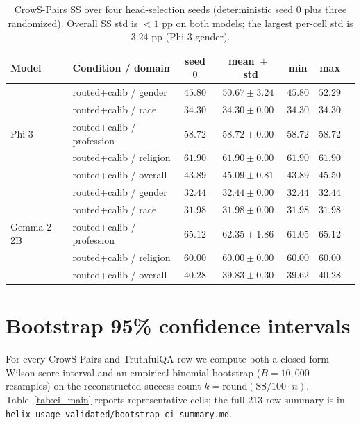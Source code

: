 \begin{table}[h]
\centering
\small
\caption{CrowS-Pairs SS over four head-selection seeds (deterministic
seed $0$ plus three randomized). Overall SS std is $<1$ pp on both
models; the largest per-cell std is $3.24$ pp (Phi-3 gender).}
\label{tab:seed_variance}
\begin{tabular}{llccccc}
\toprule
Model & Condition / domain & seed $0$ & mean~$\pm$~std & min & max \\
\midrule
\multirow{5}{*}{Phi-3}
& routed+calib / gender     & $45.80$ & $50.67 \pm 3.24$ & $45.80$ & $52.29$ \\
& routed+calib / race       & $34.30$ & $34.30 \pm 0.00$ & $34.30$ & $34.30$ \\
& routed+calib / profession & $58.72$ & $58.72 \pm 0.00$ & $58.72$ & $58.72$ \\
& routed+calib / religion   & $61.90$ & $61.90 \pm 0.00$ & $61.90$ & $61.90$ \\
& routed+calib / overall    & $43.89$ & $45.09 \pm 0.81$ & $43.89$ & $45.50$ \\
\midrule
\multirow{5}{*}{Gemma-2-2B}
& routed+calib / gender     & $32.44$ & $32.44 \pm 0.00$ & $32.44$ & $32.44$ \\
& routed+calib / race       & $31.98$ & $31.98 \pm 0.00$ & $31.98$ & $31.98$ \\
& routed+calib / profession & $65.12$ & $62.35 \pm 1.86$ & $61.05$ & $65.12$ \\
& routed+calib / religion   & $60.00$ & $60.00 \pm 0.00$ & $60.00$ & $60.00$ \\
& routed+calib / overall    & $40.28$ & $39.83 \pm 0.30$ & $39.62$ & $40.28$ \\
\bottomrule
\end{tabular}
\end{table}

\section{Bootstrap 95\% confidence intervals}
\label{app:ci}

For every CrowS-Pairs and TruthfulQA row we compute both a
closed-form Wilson score interval and an empirical binomial bootstrap
($B{=}10{,}000$ resamples) on the reconstructed success count
$k = \mathrm{round}(\mathrm{SS}/100 \cdot n)$. Table~\ref{tab:ci_main}
reports representative cells; the full $213$-row summary is in
\texttt{helix\_usage\_validated/bootstrap\_ci\_summary.md}.

